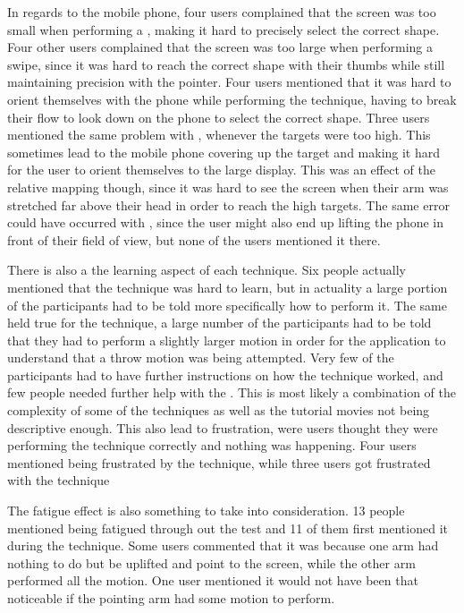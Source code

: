 In regards to the mobile phone, four users complained that the screen was too small when performing a \pinch, making it hard to precisely select the correct shape.
Four other users complained that the screen was too large when performing a swipe, since it was hard to reach the correct shape with their thumbs while still maintaining precision with the pointer. 
Four users mentioned that it was hard to orient themselves with the phone while performing the \throw technique, having to break their flow to look down on the phone to select the correct shape. 
Three users mentioned the same problem with \swipe, whenever the targets were too high.
This sometimes lead to the mobile phone covering up the target and making it hard for the user to orient themselves to the large display. 
This was an effect of the relative mapping though, since it was hard to see the screen when their arm was stretched far above their head in order to reach the high targets.
The same error could have occurred with \tilt, since the user might also end up lifting the phone in front of their field of view, but none of the users mentioned it there.  

There is also a the learning aspect of each technique. Six people actually mentioned that the \pinch technique was hard to learn, but in actuality a large portion of the participants had to be told more specifically how to perform it. 
The same held true for the \throw technique, a large number of the participants had to be told that they had to perform a slightly larger motion in order for the application to understand that a throw motion was being attempted.
Very few of the participants had to have further instructions on how the \swipe technique worked, and few people needed further help with the \tilt. 
This is most likely a combination of the complexity of some of the techniques as well as the tutorial movies not being descriptive enough. 
This also lead to frustration, were users thought they were performing the technique correctly and nothing was happening. 
Four users mentioned being frustrated by the \pinch technique, while three users got frustrated with the \tilt technique

The fatigue effect is also something to take into consideration. 13 people mentioned being fatigued through out the test and 11 of them first mentioned it during the \throw technique.
Some users commented that it was because one arm had nothing to do but be uplifted and point to the screen, while the other arm performed all the motion.
One user mentioned it would not have been that noticeable if the pointing arm had some motion to perform. 

